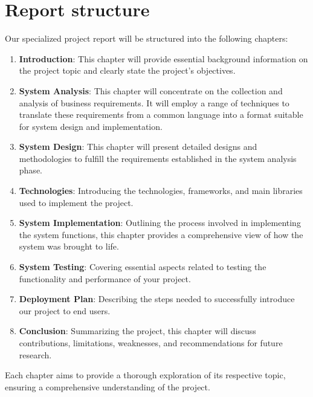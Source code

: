 \section{Report structure}
Our specialized project report will be structured into the following chapters:
\begin{enumerate}
    \item \textbf{Introduction}: This chapter will provide essential background information on the project topic and clearly state the project’s objectives.
    \item \textbf{System Analysis}:  This chapter will concentrate on the collection and analysis of business requirements. It will employ a range of techniques to translate these requirements from a common language into a format suitable for system design and implementation.
    \item \textbf{System Design}: This chapter will present detailed designs and methodologies to fulfill the requirements established in the system analysis phase.
    \item \textbf{Technologies}: Introducing the technologies, frameworks, and main libraries used to implement the project.
    \item \textbf{System Implementation}: Outlining the process involved in implementing the system functions, this chapter provides a comprehensive view of how the system was brought to life.
    \item \textbf{System Testing}:  Covering essential aspects related to testing the functionality and performance of your project.
    \item \textbf{Deployment Plan}: Describing the steps needed to successfully introduce our project to end users.
    \item \textbf{Conclusion}:  Summarizing the project, this chapter will discuss contributions, limitations, weaknesses, and recommendations for future research.
\end{enumerate}


Each chapter aims to provide a thorough exploration of its respective topic, ensuring a comprehensive understanding of the project.